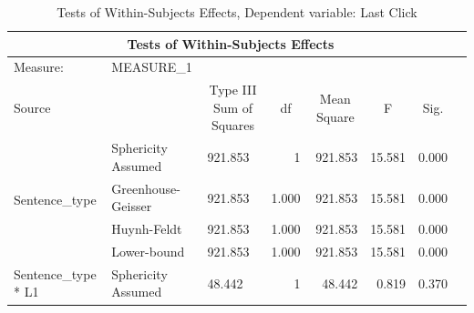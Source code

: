\documentclass[a4paper]{article}
\begin{document}
\begin{table}[H]
\begin{center}
\caption{Tests of Within-Subjects Effects, Dependent variable: Last Click}
\label{tab:withinlastclick}
\begin{tabular}{p{}p{}|l|r|r|r|r|r|} 
\hline
\multicolumn{7}{|c|}{Tests of Within-Subjects Effects}                                                                                                                                                                                         \\ 
\hline
Measure:~                                               & MEASURE\_1         & \multicolumn{1}{l|}{}                        & \multicolumn{1}{l|}{}   & \multicolumn{1}{l|}{}            & \multicolumn{1}{l|}{}  & \multicolumn{1}{l|}{}      \\ 
\hline
Source                                                  & ~                  & \multicolumn{1}{c|}{Type III Sum of Squares} & \multicolumn{1}{c|}{df} & \multicolumn{1}{c|}{Mean Square} & \multicolumn{1}{c|}{F} & \multicolumn{1}{c|}{Sig.}  \\ 
\hline
\multirow{4}{*}{Sentence\_type}                         & Sphericity Assumed & 921.853                                      & 1                       & 921.853                          & 15.581                 & 0.000                      \\ 
\cline{2-7}
                                                        & Greenhouse-Geisser & 921.853                                      & 1.000                   & 921.853                          & 15.581                 & 0.000                      \\ 
\cline{2-7}
                                                        & Huynh-Feldt        & 921.853                                      & 1.000                   & 921.853                          & 15.581                 & 0.000                      \\ 
\cline{2-7}
                                                        & Lower-bound        & 921.853                                      & 1.000                   & 921.853                          & 15.581                 & 0.000                      \\ 
\hline
\multirow{4}{*}{Sentence\_type * L1}                    & Sphericity Assumed & 48.442                                       & 1                       & 48.442                           & 0.819                  & 0.370                      \\ 

\end{tabular}
\end{center}
\end{table}
\end{document}
